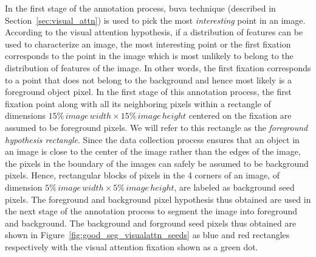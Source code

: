 \documentclass {udthesis}
\begin{document}
In the first stage of the annotation process, \gls{buva} technique (described in Section~\ref{sec:visual_attn}) is used to pick the most \textit{interesting} point in an image. According to the visual attention hypothesis, if a distribution of features can be used to characterize an image, the most interesting point or the first fixation corresponds to the point in the image which is most unlikely to belong to the distribution of features of the image. In other words, the first fixation corresponds to a point that does not belong to the background and hence most likely is a foreground object pixel. In the first stage of this annotation process, the first fixation point along with all its neighboring pixels within a rectangle of dimensions $15\% \,image\, width \times 15\% \,image\, height$ centered on the fixation are assumed to be foreground pixels. We will refer to this rectangle as the \textit{foreground hypothesis rectangle}.
Since the data collection  process ensures that an object in an image is close to the center of the image rather than the edges of the image, the pixels in the boundary of the images can safely be assumed to be background pixels. Hence, rectangular blocks of pixels in the 4 corners of an image, of dimension $5\% \,image\, width \times 5\% \,image\, height$, are labeled as background seed pixels. The foreground and background pixel hypothesis thus obtained are used in the next stage of the annotation process to segment the image into foreground and background. The background and forground seed pixels thus obtained are shown in Figure~\ref{fig:good_seg_visualattn_seeds} as blue and red rectangles respectively with the visual attention fixation shown as a green dot.
\end{document}
